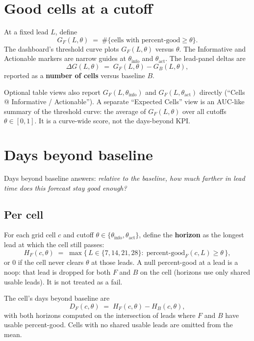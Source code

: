 \documentclass[11pt]{article}
\begin{document}
\section{Good cells at a cutoff}

At a fixed lead \(L\), define
\[
G_F(L,\theta)
  \;=\;
  \#\{\text{cells with percent-good}\ge\theta\}.
\]
The dashboard's threshold curve plots \(G_F(L,\theta)\) versus \(\theta\).
The Informative and Actionable markers are narrow guides at
\(\theta_{\mathrm{info}}\) and \(\theta_{\mathrm{act}}\).
The lead-panel deltas are
\[
\Delta G(L,\theta)
  \;=\;
  G_F(L,\theta) - G_B(L,\theta),
\]
reported as a \textbf{number of cells} versus baseline \(B\).

Optional table views also report \(G_F(L,\theta_{\mathrm{info}})\) and
\(G_F(L,\theta_{\mathrm{act}})\) directly
(``Cells @ Informative / Actionable'').
A separate ``Expected Cells'' view is an AUC-like summary of the threshold
curve: the average of \(G_F(L,\theta)\) over all cutoffs \(\theta \in [0,1]\).
It is a curve-wide score, not the days-beyond KPI.

\section{Days beyond baseline}

Days beyond baseline answers: \emph{relative to the baseline, how much farther
in lead time does this forecast stay good enough?}

\subsection*{Per cell}

For each grid cell \(c\) and cutoff
\(\theta \in \{\theta_{\mathrm{info}},\theta_{\mathrm{act}}\}\),
define the \textbf{horizon} as the longest lead at which the cell still passes:
\begin{equation}
H_F(c,\theta)
  \;=\;
  \max\bigl\{\,
    L \in \{7,14,21,28\}
    :\;
    \text{percent-good}_F(c,L) \ge \theta
  \,\bigr\},
\end{equation}
or \(0\) if the cell never clears \(\theta\) at those leads.
A null percent-good at a lead is a noop: that lead is dropped for both
\(F\) and \(B\) on the cell (horizons use only shared usable leads). It is
not treated as a fail.

The cell's days beyond baseline are
\begin{equation}
D_F(c,\theta)
  \;=\;
  H_F(c,\theta) - H_B(c,\theta),
\end{equation}
with both horizons computed on the intersection of leads where \(F\) and
\(B\) have usable percent-good. Cells with no shared usable leads are
omitted from the mean.
\end{document}

